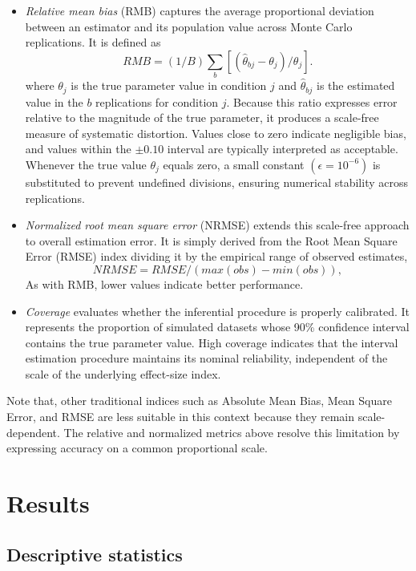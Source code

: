 \documentclass[
  12pt,
  a4paper,
  DIV=11,
  numbers=noendperiod]{scrartcl}
\begin{document}
\begin{itemize}
\item
  \emph{Relative mean bias} (RMB) captures the average proportional
  deviation between an estimator and its population value across Monte
  Carlo replications. It is defined as \[
  RMB = (1/B) \sum_b \left[ (\hat{\theta}_{bj} − \theta_j) / \theta_j \right].
  \] where \(\theta_j\) is the true parameter value in condition \(j\)
  and \(\hat{\theta}_{bj}\) is the estimated value in the \(b\)
  replications for condition \(j\). Because this ratio expresses error
  relative to the magnitude of the true parameter, it produces a
  scale-free measure of systematic distortion. Values close to zero
  indicate negligible bias, and values within the \(\pm 0.10\) interval
  are typically interpreted as acceptable. Whenever the true value
  \(\theta_j\) equals zero, a small constant \((\epsilon = 10^{-6})\) is
  substituted to prevent undefined divisions, ensuring numerical
  stability across replications.
\item
  \emph{Normalized root mean square error} (NRMSE) extends this
  scale-free approach to overall estimation error. It is simply derived
  from the Root Mean Square Error (RMSE) index dividing it by the
  empirical range of observed estimates, \[
  NRMSE = RMSE / (max(obs) − min(obs)),
  \] As with RMB, lower values indicate better performance.
\item
  \emph{Coverage} evaluates whether the inferential procedure is
  properly calibrated. It represents the proportion of simulated
  datasets whose 90\% confidence interval contains the true parameter
  value. High coverage indicates that the interval estimation procedure
  maintains its nominal reliability, independent of the scale of the
  underlying effect-size index.
\end{itemize}

Note that, other traditional indices such as Absolute Mean Bias, Mean
Square Error, and RMSE are less suitable in this context because they
remain scale-dependent. The relative and normalized metrics above
resolve this limitation by expressing accuracy on a common proportional
scale.

\section{Results}\label{results}

\subsection{Descriptive statistics}\label{descriptive-statistics}
\end{document}
